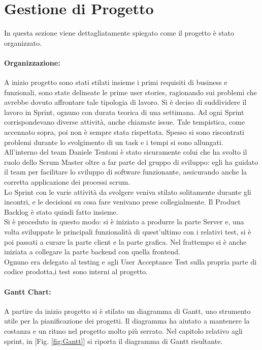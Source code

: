 \section{Gestione di Progetto}
In questa sezione viene dettagliatamente spiegato come il progetto è stato organizzato. 
    \paragraph{Organizzazione: }
    A inizio progetto sono stati stilati insieme i primi requisiti di business e funzionali, sono state delineate le prime user stories, ragionando sui problemi che avrebbe dovuto affrontare tale tipologia di lavoro.
   Si è deciso di suddividere il lavoro in Sprint, ognuno con durata teorica di una settimana. Ad ogni Sprint corrispondevano diverse attività, anche chiamate issue. Tale tempistica, come accennato sopra, poi non è sempre stata rispettata. Spesso si sono riscontrati problemi durante lo svolgimento di un task e i tempi si sono allungati.\\
    All'interno del team Daniele Tentoni è stato sicuramente colui che ha svolto il ruolo dello Scrum Master oltre a far parte del gruppo di sviluppo: egli ha guidato il team per facilitare lo sviluppo di software funzionante, assicurando anche la corretta applicazione dei processi scrum.\\
    Lo Sprint con le varie attività da svolgere veniva stilato solitamente durante gli incontri, e le decisioni su cosa fare venivano prese collegialmente. Il Product Backlog è stato quindi fatto insieme.\\ 
    Si è proceduto in questo modo: si è iniziato a produrre la parte Server e, una volta sviluppate le principali funzionalità di quest'ultimo con i relativi test, si è poi passati a curare la parte client e la parte grafica. Nel frattempo si è anche iniziata a collegare la parte backend con quella frontend.\\
    Ognuno era delegato al testing e agli User Acceptance Test sulla propria parte di codice prodotta,i test sono interni al progetto. 
    
    
    
    \paragraph{Gantt Chart: } 
    A partire da inizio progetto si è stilato un diagramma di Gantt, uno strumento utile per la pianificazione dei progetti. Il diagramma ha aiutato a mantenere la costanza e un ritmo nel progetto molto più serrato. Nel capitolo relativo agli sprint, in [Fig. \ref{fig:Gantt}] si riporta il diagramma di Gantt risultante.
    
